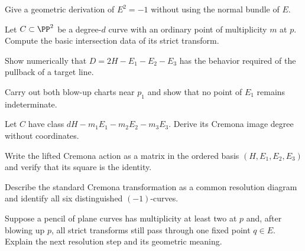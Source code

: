 \begin{problem}\label{prob:vi45-04}
Give a geometric derivation of \(E^2=-1\) without using the normal bundle of \(E\).
\end{problem}

\begin{problem}\label{prob:vi45-05}
Let \(C\subset\PP^2\) be a degree-\(d\) curve with an ordinary point of multiplicity \(m\) at \(p\).  Compute the basic intersection data of its strict transform.
\end{problem}

\begin{problem}\label{prob:vi45-06}
Show numerically that \(D=2H-E_1-E_2-E_3\) has the behavior required of the pullback of a target line.
\end{problem}

\begin{problem}\label{prob:vi45-07}
Carry out both blow-up charts near \(p_1\) and show that no point of \(E_1\) remains indeterminate.
\end{problem}

\begin{problem}\label{prob:vi45-08}
Let \(C\) have class \(dH-m_1E_1-m_2E_2-m_3E_3\).  Derive its Cremona image degree without coordinates.
\end{problem}

\begin{problem}\label{prob:vi45-09}
Write the lifted Cremona action as a matrix in the ordered basis \((H,E_1,E_2,E_3)\) and verify that its square is the identity.
\end{problem}

\begin{problem}\label{prob:vi45-10}
Describe the standard Cremona transformation as a common resolution diagram and identify all six distinguished \((-1)\)-curves.
\end{problem}

\begin{problem}\label{prob:vi45-11}
Suppose a pencil of plane curves has multiplicity at least two at \(p\) and, after blowing up \(p\), all strict transforms still pass through one fixed point \(q\in E\).  Explain the next resolution step and its geometric meaning.
\end{problem}

